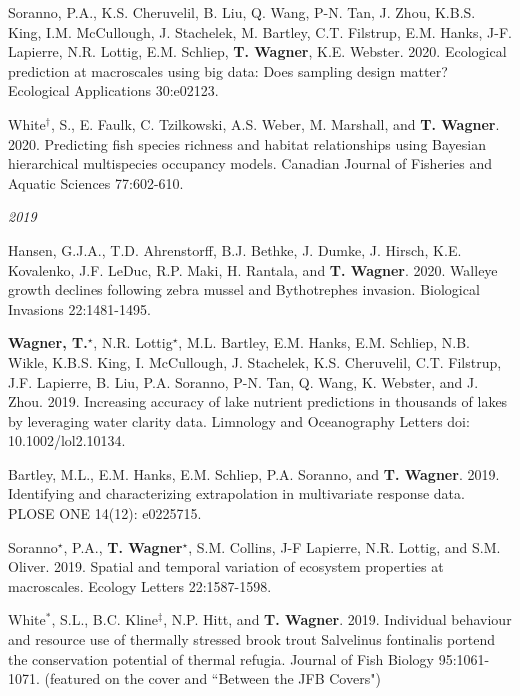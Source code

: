 \documentclass[10pt]{article}
\begin{document}
\begin{flushleft}
\begin{etaremune}[start=103]
\item Soranno, P.A., K.S. Cheruvelil, B. Liu, Q. Wang, P-N. Tan, J. Zhou, K.B.S. King, I.M. McCullough, J. Stachelek, M. Bartley, C.T. Filstrup, E.M. Hanks, J-F. Lapierre, N.R. Lottig, E.M. Schliep, \textbf{T. Wagner}, K.E. Webster. 2020. Ecological prediction at macroscales using big data: Does sampling design matter? Ecological Applications 30:e02123. 

\item White$^\dagger$, S., E. Faulk, C. Tzilkowski, A.S. Weber, M. Marshall, and \textbf{T. Wagner}. 2020. Predicting fish species richness and habitat relationships using Bayesian hierarchical multispecies occupancy models. Canadian Journal of Fisheries and Aquatic Sciences 77:602-610.
	
\end{etaremune}

\vspace{5pt}
\emph{2019}
\begin{etaremune}[start=91]


\item Hansen, G.J.A., T.D. Ahrenstorff, B.J. Bethke, J. Dumke, J. Hirsch, K.E. Kovalenko, J.F. LeDuc, R.P. Maki, H. Rantala, and \textbf{T. Wagner}. 2020. Walleye growth declines following zebra mussel and Bythotrephes invasion. Biological Invasions 22:1481-1495.

\item \textbf{Wagner, T.$^\star$}, N.R. Lottig$^\star$, M.L. Bartley, E.M. Hanks, E.M. Schliep, N.B. Wikle, K.B.S. King, I. McCullough, J. Stachelek, K.S. Cheruvelil, C.T. Filstrup, J.F. Lapierre, B. Liu, P.A. Soranno, P-N. Tan, Q. Wang, K. Webster, and J. Zhou. 2019. Increasing accuracy of lake nutrient predictions in thousands of lakes by leveraging water clarity data. Limnology and Oceanography Letters doi: 10.1002/lol2.10134. 

\item Bartley, M.L., E.M. Hanks, E.M. Schliep, P.A. Soranno, and \textbf{T. Wagner}. 2019. Identifying and characterizing extrapolation in multivariate response data. PLOSE ONE 14(12): e0225715.

\item Soranno$^\star$, P.A., \textbf{T. Wagner$^\star$}, S.M. Collins, J-F Lapierre, N.R. Lottig, and S.M. Oliver. 2019. Spatial and temporal variation of ecosystem properties at macroscales. Ecology Letters 22:1587-1598.

\item White$^*$, S.L., B.C. Kline$^\ddagger$, N.P. Hitt, and\textbf{ T. Wagner}. 2019. Individual behaviour and resource use of thermally stressed brook trout Salvelinus fontinalis portend the conservation potential of thermal refugia. Journal of Fish Biology 95:1061-1071. (featured on the cover and ``Between the JFB Covers")


\end{etaremune}
\end{flushleft}
\end{document}
